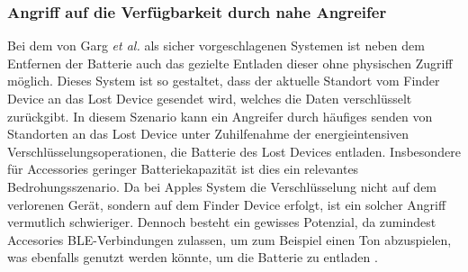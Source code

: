 \subsubsection{Angriff auf die Verfügbarkeit durch nahe Angreifer}
Bei dem von Garg \textit{et al.} \cite{Garg_Secure_Tracker} als sicher vorgeschlagenen Systemen ist neben dem Entfernen der Batterie auch das gezielte Entladen dieser ohne physischen Zugriff möglich.
Dieses System ist so gestaltet, dass der aktuelle Standort vom Finder Device an das Lost Device gesendet wird, welches die Daten verschlüsselt zurückgibt.
In diesem Szenario kann ein Angreifer durch häufiges senden von Standorten an das Lost Device unter Zuhilfenahme der energieintensiven Verschlüsselungsoperationen, die Batterie des Lost Devices entladen.
Insbesondere für Accessories geringer Batteriekapazität ist dies ein relevantes Bedrohungsszenario.
Da bei Apples System die Verschlüsselung nicht auf dem verlorenen Gerät, sondern auf dem Finder Device erfolgt, ist ein solcher Angriff vermutlich schwieriger.
Dennoch besteht ein gewisses Potenzial, da zumindest Accesories \ac{BLE}-Verbindungen zulassen, um zum Beispiel einen Ton abzuspielen, was ebenfalls genutzt werden könnte, um die Batterie zu entladen \cite{Heinrich_AirGuard}.

